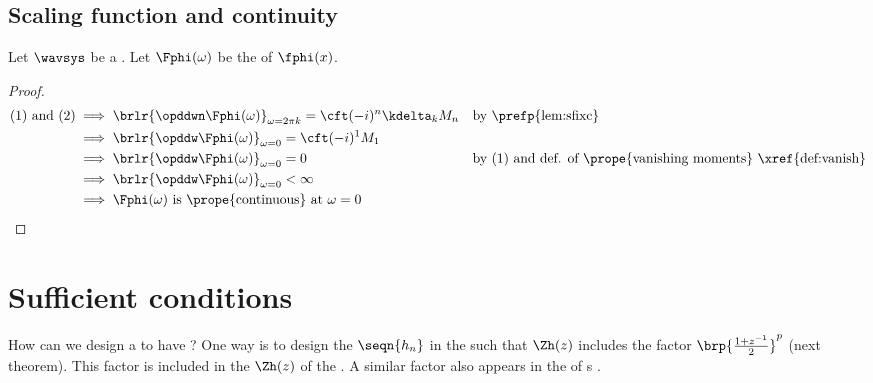 \subsection{Scaling function and continuity}
\begin{theorem}
\label{thm:vanish_continuous}
Let $\wavsys$ be a  .
Let $\Fphi(\omega)$ be the   of $\fphi(x)$.
\end{theorem}
\begin{proof}
  \begin{align*}
    \text{(1) and (2)}
      &\implies \brlr{\opddwn  \Fphi(\omega)}_{\omega=2\pi k}=\cft (-i)^n \kdelta_k M_n
      && \text{by \prefp{lem:sfixc}}
    \\&\implies \brlr{\opddw \Fphi(\omega)}_{\omega=0} = \cft (-i)^1 M_1
    \\&\implies \brlr{\opddw \Fphi(\omega)}_{\omega=0} = 0
      && \text{by (1) and def. of \prope{vanishing moments} \xref{def:vanish}}
    \\&\implies \brlr{\opddw \Fphi(\omega)}_{\omega=0} < \infty
    \\&\implies \text{$\Fphi(\omega)$ is \prope{continuous} at $\omega=0$}
  \end{align*}
\end{proof}

\section{Sufficient conditions}
How can we design a   to have ?
One way is to design the   $\seqn{h_n}$ in the  
such that $\Zh(z)$ includes the factor $\brp{\frac{1+z^{-1}}{2}}^p$ (next theorem).
This factor is included in the $\Zh(z)$ of the .
A similar factor  also appears in the  
of s .

